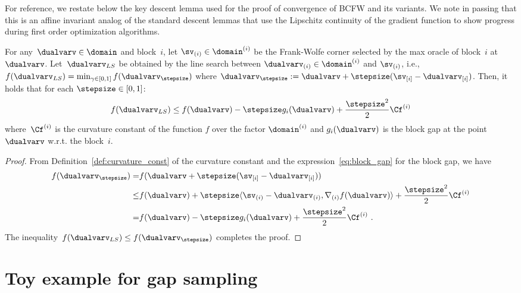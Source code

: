 \documentclass{article}
\begin{document}
For reference, we restate below the key descent lemma used for the proof of convergence of BCFW and its variants. We note in passing that this is an affine invariant analog of the standard descent lemmas that use the Lipschitz continuity of the gradient function to show progress during first order optimization algorithms.


%
%
%

\begin{lemma}\label{lem:block_step_improvement}
    For any~$\dualvarv \in \domain$ and block~$i$, let $\sv_{(i)}\in \domain^{(i)}$ be the Frank-Wolfe corner selected by the max oracle of block~$i$ at~$\dualvarv$. Let~$\dualvarv_{LS}$ be obtained by the line search between $\dualvarv_{(i)} \in \domain^{(i)}$ and $\sv_{(i)}$, i.e.,  $f(\dualvarv_{LS}) = \min_{\gamma\in[0,1]} f(\dualvarv_\stepsize)$ where $\dualvarv_\stepsize := \dualvarv+\stepsize(\sv_{[i]}-\dualvarv_{[i]})$. Then, it holds that for each $\stepsize\in[0,1]$: \\[-2mm]
    \begin{equation}
    \label{eq:block_descent_line_search_lemma}
    f(\dualvarv_{LS})
    \le f(\dualvarv) - \stepsize g_i(\dualvarv) + \frac{\stepsize^2}{2} \Cf^{(i)}\\[-1mm]
    \end{equation}
    where~$\Cf^{(i)}$ is the curvature constant of the function $f$ over the factor $\domain^{(i)}$ and $g_i(\dualvarv)$ is the block gap at the point~$\dualvarv$ w.r.t. the block~$i$.
\end{lemma}
\begin{proof}
    From Definition~\ref{def:curvature_const} of the curvature constant and the expression~\eqref{eq:block_gap} for the block gap, we have
    \begin{align*}
    f(\dualvarv_\stepsize) = & f(\dualvarv+\stepsize(\sv_{[i]}-\dualvarv_{[i]})) \\
    \le & f(\dualvarv) + \stepsize \langle \sv_{(i)}-\dualvarv_{(i)}, \nabla_{(i)} f(\dualvarv)\rangle + \frac{\stepsize^2}{2}\Cf^{(i)} \\
    = & f(\dualvarv) - \stepsize g_i(\dualvarv) + \frac{\stepsize^2}{2}\Cf^{(i)} \ .
    \end{align*}
    The inequality~$f(\dualvarv_{LS}) \leq f(\dualvarv_\stepsize)$ completes the proof.
\end{proof}




\section{Toy example for gap sampling \label{app:toy_example}}
%
%
%
%
%
%
%
\end{document}
